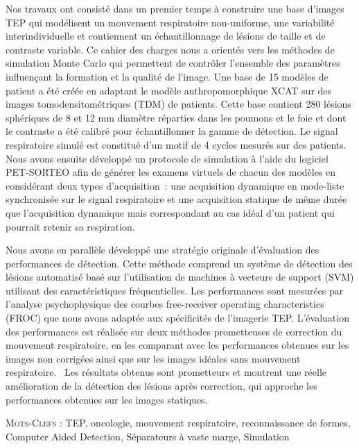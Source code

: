 Nos travaux ont consisté dans un premier temps à construire une base d’images TEP qui modélisent un mouvement respiratoire non-uniforme, une variabilité interindividuelle et contiennent un échantillonnage de lésions de taille et de contraste variable. Ce cahier des charges nous a orientés vers les méthodes de simulation Monte Carlo qui permettent de contrôler l’ensemble des paramètres influençant la formation et la qualité de l’image. Une base de 15 modèles de patient a été créée en adaptant le modèle anthropomorphique XCAT sur des images tomodensitométriques (TDM) de patients. Cette base contient 280 lésions sphériques de 8 et 12 mm diamètre réparties dans les poumons et le foie et dont le contraste a été calibré pour échantillonner la gamme de détection. Le signal respiratoire simulé est constitué d’un motif de 4 cycles mesurés sur des patients. Nous avons ensuite développé un protocole de simulation à l’aide du logiciel PET-SORTEO afin de générer les examens virtuels de chacun des modèles en considérant deux types d’acquisition : une acquisition dynamique en mode-liste synchronisée sur le signal respiratoire et une acquisition statique de même durée que l’acquisition dynamique mais correspondant au cas idéal d’un patient qui pourrait retenir sa respiration.

Nous avons en parallèle développé une stratégie originale d’évaluation des performances de détection. Cette méthode comprend un système de détection des lésions automatisé basé sur l'utilisation de machines à vecteurs de support (SVM) utilisant des caractéristiques fréquentielles. Les performances sont mesurées par l’analyse psychophysique des courbes free-receiver operating characteristics (FROC) que nous avons adaptée aux spécificités de l’imagerie TEP. L’évaluation des performances est réalisée sur deux méthodes prometteuses de correction du mouvement respiratoire, en les comparant avec les performances obtenues sur les images non corrigées ainsi que sur les images idéales sans mouvement respiratoire. 
Les résultats obtenus sont prometteurs et montrent une réelle amélioration de la détection des lésions après correction, qui approche les performances obtenues sur les images statiques. 

\textsc{Mots-Clefs :} TEP, oncologie, mouvement respiratoire, reconnaissance de formes, Computer Aided Detection, Séparateurs à vaste marge, Simulation